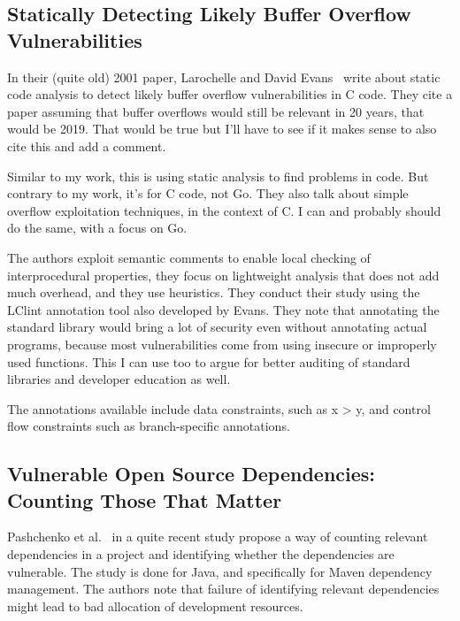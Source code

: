 
\subsection{Statically Detecting Likely Buffer Overflow Vulnerabilities}
\label{subsec:statically-detecting-likely-buffer-overflow-vulnerabilities}

In their (quite old) 2001 paper, Larochelle and David Evans~\cite{larochelle2001} write about static code analysis to
detect likely buffer overflow vulnerabilities in C code.
They cite a paper assuming that buffer overflows would still be relevant in 20 years, that would be 2019.
That would be true but I'll have to see if it makes sense to also cite this and add a comment.

Similar to my work, this is using static analysis to find problems in code.
But contrary to my work, it's for C code, not Go.
They also talk about simple overflow exploitation techniques, in the context of C\@.
I can and probably should do the same, with a focus on Go.

The authors exploit semantic comments to enable local checking of interprocedural properties, they focus on lightweight
analysis that does not add much overhead, and they use heuristics.
They conduct their study using the LClint annotation tool also developed by Evans.
They note that annotating the standard library would bring a lot of security even without annotating actual programs,
because most vulnerabilities come from using insecure or improperly used functions.
This I can use too to argue for better auditing of standard libraries and developer education as well.

The annotations available include data constraints, such as x > y, and control flow constraints such as branch-specific
annotations.



\subsection{Vulnerable Open Source Dependencies: Counting Those That Matter}
\label{subsec:vulnerable-open-source-dependencies:-counting-those-that-matter}

Pashchenko et al.~\cite{pashchenko2018} in a quite recent study propose a way of counting relevant dependencies in a
project and identifying whether the dependencies are vulnerable.
The study is done for Java, and specifically for Maven dependency management.
The authors note that failure of identifying relevant dependencies might lead to bad allocation of development resources.

